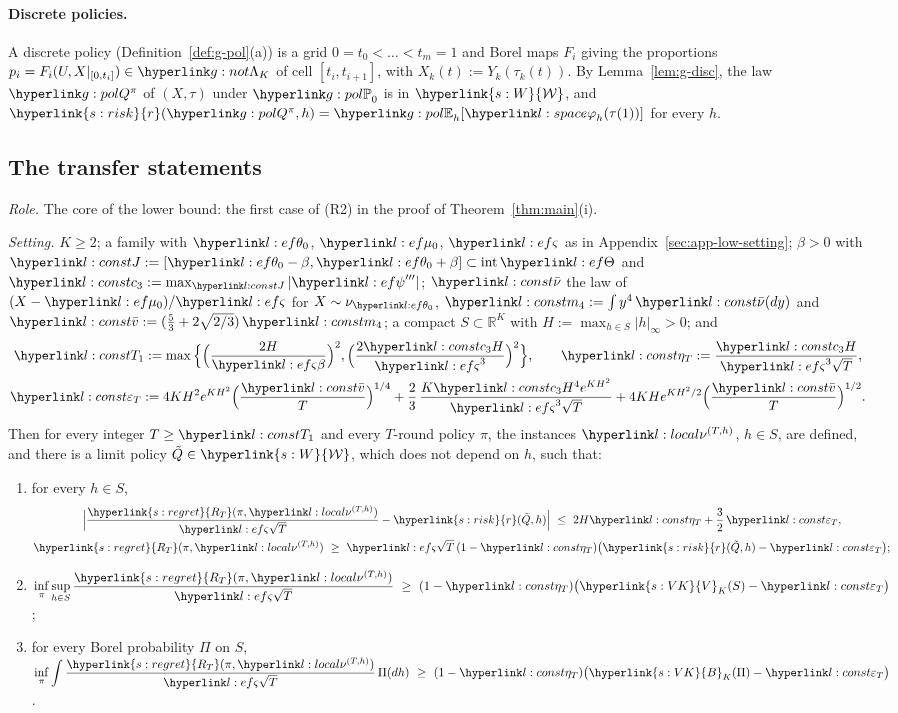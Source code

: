 \documentclass[11pt]{article}
\newcommand{\dt}[1]{\hypertarget{#1}{}}
\DeclareRobustCommand{\sy}[2]{{\hyperlink{#1}{#2}}}
\newcommand{\R}{\mathbb{R}}
\newcommand{\1}{\mathbf{1}}
\newcommand{\RT}{\sy{s:regret}{R_T}}
\newcommand{\Wc}{\sy{s:W}{\mathcal W}}
\newcommand{\rk}{\sy{s:risk}{r}}
\newcommand{\VK}{\sy{s:VK}{V}}
\newcommand{\BK}{\sy{s:VK}{B}}
\begin{document}
\paragraph{Discrete policies.} A discrete policy (Definition~\ref{def:g-pol}(a)) is a grid $0=t_0<\dots<t_m=1$ and Borel maps $F_i$ giving the proportions
$p_i=F_i(U,X|_{[0,t_i]})\in\gSmp$ of cell $[t_i,t_{i+1}]$, with $X_k(t):=Y_k(\tau_k(t))$. By Lemma~\ref{lem:g-disc}, the law $\gQp\pi$ of $(X,\tau)$ under $\gPh_0$ is in
$\Wc$, and $\rk(\gQp\pi,h)=\gEh_h[\lphi_h(\tau(1))]$ for every $h$.

\subsection{The transfer statements}\label{sec:app-low-statements}

\begin{theorem}\label{thm:lowEF}\dt{l:const}
\textit{Role.} The core of the lower bound: the first case of (R2) in the proof of Theorem~\ref{thm:main}(i).

\noindent\textit{Setting.} $K\ge2$; a family with $\lthz$, $\lmuz$, $\lsd$ as in Appendix~\ref{sec:app-low-setting}; $\beta>0$ with $\lJ:=[\lthz-\beta,\lthz+\beta]\subset\operatorname{int}\lTh$
and $\lcth:=\max_{\lJ}|\lpsi'''|$; $\lnub$ the law of $(X-\lmuz)/\lsd$ for $X\sim\nu_{\lthz}$, $\lmq:=\int y^4\,\lnub(dy)$ and $\lvb:=(\frac53+2\sqrt{2/3})\,\lmq$; a compact
$S\subset\R^K$ with $H:=\max_{h\in S}|h|_\infty>0$; and
\begin{gather*}
\lTone:=\max\Big\{\Big(\frac{2H}{\lsd\beta}\Big)^2,\Big(\frac{2\lcth H}{\lsd^3}\Big)^2\Big\},\qquad \letT:=\frac{\lcth H}{\lsd^3\sqrt T},\\
\lepT:=4KH^2e^{KH^2}\Big(\frac{\lvb}T\Big)^{1/4}+\frac23\,\frac{K\lcth H^4e^{KH^2}}{\lsd^3\sqrt T}+4KHe^{KH^2/2}\Big(\frac{\lvb}T\Big)^{1/2}.
\end{gather*}
Then for every integer $T\ge\lTone$ and every $T$-round policy $\pi$, the instances $\lnuT$, $h\in S$, are defined, and there is a limit policy $\tilde Q\in\Wc$, which
does not depend on $h$, such that:
\begin{enumerate}
\item[(i)] for every $h\in S$,
\begin{gather*}
\Big|\frac{\RT(\pi,\lnuT)}{\lsd\sqrt T}-\rk(\tilde Q,h)\Big|\ \le\ 2H\letT+\frac32\,\lepT,\\
\RT(\pi,\lnuT)\ \ge\ \lsd\sqrt T\,(1-\letT)\big(\rk(\tilde Q,h)-\lepT\big);
\end{gather*}
\item[(ii)] $\displaystyle\inf_\pi\sup_{h\in S}\frac{\RT(\pi,\lnuT)}{\lsd\sqrt T}\ \ge\ (1-\letT)\big(\VK_K(S)-\lepT\big)$;
\item[(iii)] for every Borel probability $\Pi$ on $S$, $\displaystyle\inf_\pi\int\frac{\RT(\pi,\lnuT)}{\lsd\sqrt T}\,\Pi(dh)\ \ge\ (1-\letT)\big(\BK_K(\Pi)-\lepT\big)$.
\end{enumerate}
\end{theorem}
\end{document}
